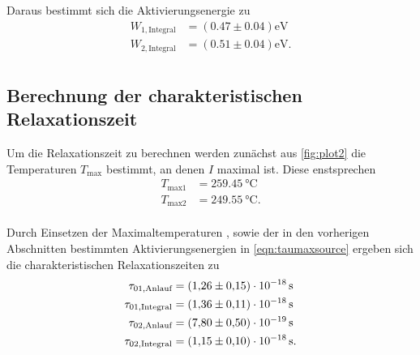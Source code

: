 Daraus bestimmt sich die Aktivierungsenergie zu 
\begin{align*}
  W_{1,\text{Integral}} &= (0.47 \pm 0.04) \unit{\electronvolt}\\
  W_{2,\text{Integral}} &= (0.51 \pm 0.04)\unit{\electronvolt}.\\
\end{align*} 


\subsection{Berechnung der charakteristischen Relaxationszeit}

Um die Relaxationszeit zu berechnen werden zunächst aus \autoref{fig:plot2} die Temperaturen $T_\text{max}$ bestimmt, an denen $I$ maximal ist.
Diese enstsprechen
\begin{align*}
  T_\text{max1} &= \qty{259.45}{\celsius}\\
  T_\text{max2} &= \qty{249.55}{\celsius}.\\
\end{align*}

Durch Einsetzen der Maximaltemperaturen , sowie der in den vorherigen Abschnitten bestimmten Aktivierungsenergien
in \autoref{eqn:taumaxsource} ergeben sich die charakteristischen Relaxationszeiten zu
\begin{align*}
  \tau_{01,\text{Anlauf}} &= \qty{1.26 (15)e-18}{\second}\\ 
  \tau_{01,\text{Integral}} &=\qty{1.36 (11)e-18}{\second}\\
  \tau_{02,\text{Anlauf}} &= \qty{7.80 (50)e-19}{\second}\\
  \tau_{02,\text{Integral}} &=\qty{1.15 (0.10)e-18}{\second}.\\
\end{align*}
